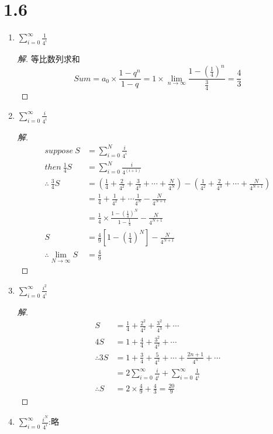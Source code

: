 \documentclass[utf8]{ctexart}
\begin{document}
\section*{1.6}
\begin{enumerate}
\item $\displaystyle\sum_{i=0}^{\infty} \frac{1}{4^i}$ 
\begin{proof}[解]
等比数列求和
\[ 
Sum = a_0 \times \frac{1-q^n}{1-q} = 1 \times \lim_{n \to \infty}\frac{1-(\frac 14)^n}{\frac 34} = \frac 43
\]
\end{proof}
\item $\displaystyle \sum_{i =0 }^{\infty} \frac i{4^i}$
\begin{proof}[解]
\begin{align*}
suppose\ S &= \sum_{i = 0}^{N}  \frac i {4^i} \\ 
then\ \frac 14 S  &= \sum_{i = 0}^{N} \frac{i}{4^{(i+1)}}\\
\therefore\ \frac 34 S  &=  (\frac 14 + \frac 2{4^2} + \frac 3{4^3} + \cdots + \frac N {4^N}) - (\frac 1 {4^2} + \frac 2{4^3} +\cdots + \frac N{4^{N+1}})\\
& = \frac 14 +\frac 1 {4^2} +\cdots \frac 1{4^N} - \frac N{4^{N+1}}\\
& = \frac 14\times  \frac{1-(\frac 14)^N}{1-\frac 14} - \frac{N}{4^{N+1}}\\ 
S& =  \frac 49\left[1-(\frac 14)^N\right] - \frac{N}{4^{N+1}}\\
\therefore \lim_{N \to \infty} S &= \frac 49
\end{align*}
\end{proof}
\item $\displaystyle \sum_{i=0}^{\infty} \frac{i^2}{4^i}$
\begin{proof}[解]
\begin{align*}
S &= \frac 14 + \frac{2^2}{4^2} + \frac{3^2}{4^3} +\cdots\\
4S &= 1+ \frac 44 + \frac {3^2} {4^2} +\cdots \\
\therefore 3S & = 1 + \frac 34 + \frac 5{4^2} +\cdots + \frac{2n+1}{4^n} + \cdots\\
& =  2 \sum_{i=0}^{\infty} \frac i {4^i} + \sum_{i = 0}^{\infty} \frac 1{4^i}\\
\therefore S & = 2\times \frac 49 + \frac 43 = \frac {20}9
\end{align*} 
\end{proof}
\item $\displaystyle \sum_{i=0}^{\infty} \frac{i^N}{4^i}$:略
\end{enumerate}
\end{document}

